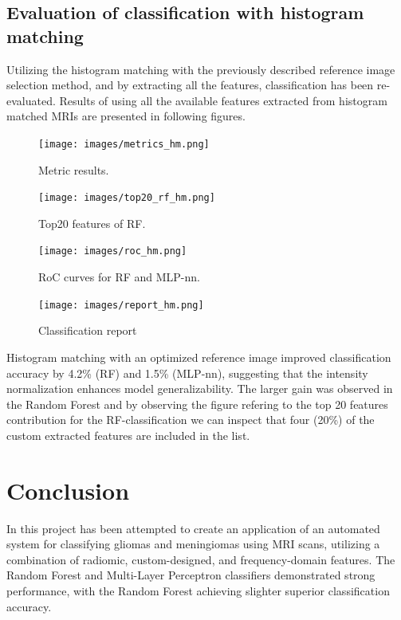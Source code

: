 \documentclass[11pt,a4paper]{article}
\begin{document}
\subsection{Evaluation of classification with histogram matching}

		Utilizing the histogram matching with the previously described reference image selection method,
		and by extracting all the features, classification has been re-evaluated.
		Results of using all the available features extracted from histogram matched MRIs 
		are presented in following figures.
		\begin{figure}[H]
			\centering
			\texttt{[image: images/metrics\_hm.png]}
			\caption{Metric results.}
			\label{fig1:}
		\end{figure}		

		\begin{figure}[H]
			\centering
			\texttt{[image: images/top20\_rf\_hm.png]}
			\caption{Top20 features of RF.}
			\label{fig1:}
		\end{figure}		

		\begin{figure}[H]
			\centering
			\texttt{[image: images/roc\_hm.png]}
			\caption{RoC curves for RF and MLP-nn.}
			\label{fig1:}
		\end{figure}		

		\begin{figure}[H]
			\centering
			\texttt{[image: images/report\_hm.png]}
			\caption{Classification report}
			\label{fig1:}
		\end{figure}		

Histogram matching with an optimized reference image improved 
classification accuracy by 4.2\% (RF) and 1.5\% (MLP-nn), 
suggesting that the intensity normalization enhances model generalizability. 
The larger gain was observed in the Random Forest and by observing the figure refering to the
top 20 features contribution for the RF-classification we can inspect that four (20\%) of the 
custom extracted features are included in the list.

\section{Conclusion}

In this project has been attempted to create an application of an automated system for 
classifying gliomas and meningiomas using MRI scans, utilizing a combination of radiomic, custom-designed, and frequency-domain features. 
The Random Forest and Multi-Layer Perceptron classifiers 
demonstrated strong performance, 
with the Random Forest achieving slighter superior classification accuracy. 
\end{document}
